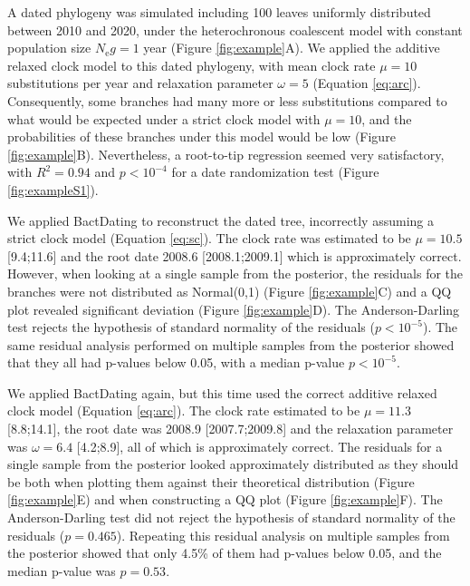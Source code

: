 \documentclass{article}
\begin{document}
A dated phylogeny was simulated including 100 leaves uniformly distributed between 2010 and 2020, 
under the heterochronous coalescent model \citep{Drummond2002}
with constant population size $N_\mathrm{e}g=1$ year (Figure \ref{fig:example}A). 
We applied the additive relaxed clock model \citep{Didelot2021} to this dated phylogeny,
with mean clock rate $\mu=10$ substitutions per year and relaxation parameter $\omega=5$ (Equation \ref{eq:arc}).
Consequently, some branches had many more or less substitutions compared to what would be expected
under a strict clock model with $\mu=10$, and the probabilities of these branches
under this model would be low (Figure \ref{fig:example}B). Nevertheless, a root-to-tip regression seemed
very satisfactory, with $R^2=0.94$ and $p<10^{-4}$ for 
a date randomization test (Figure \ref{fig:exampleS1}).

We applied BactDating \citep{Didelot2018} to reconstruct the dated tree, 
incorrectly assuming a strict clock model (Equation \ref{eq:sc}).
The clock rate was estimated to be $\mu=10.5$ [9.4;11.6] and the root date 
2008.6 [2008.1;2009.1] which is approximately correct.
However, when looking at a single sample from the posterior,
the residuals for the branches were not distributed as Normal(0,1) (Figure \ref{fig:example}C)
and a QQ plot revealed significant deviation (Figure \ref{fig:example}D). 
The Anderson-Darling test rejects the hypothesis of standard normality of the residuals ($p<10^{-5}$).
The same residual analysis performed on multiple samples from the posterior showed that they all
had p-values below 0.05, with a median p-value $p<10^{-5}$.

We applied BactDating again, but this time used the correct additive relaxed clock model (Equation \ref{eq:arc}). 
The clock rate estimated to be $\mu=11.3$ [8.8;14.1], the root date was 2008.9 [2007.7;2009.8]
and the relaxation parameter was $\omega=6.4$ [4.2;8.9], all of which is approximately correct.
The residuals for a single sample from the posterior 
looked approximately distributed as they should be both when plotting them against
their theoretical distribution (Figure \ref{fig:example}E) and when constructing a QQ plot (Figure \ref{fig:example}F).
The Anderson-Darling test did not reject the hypothesis of standard normality of the residuals ($p=0.465$).
Repeating this residual analysis on multiple samples from the posterior showed that only 4.5\% of 
them had p-values below 0.05, and the median p-value was $p=0.53$.
\end{document}
